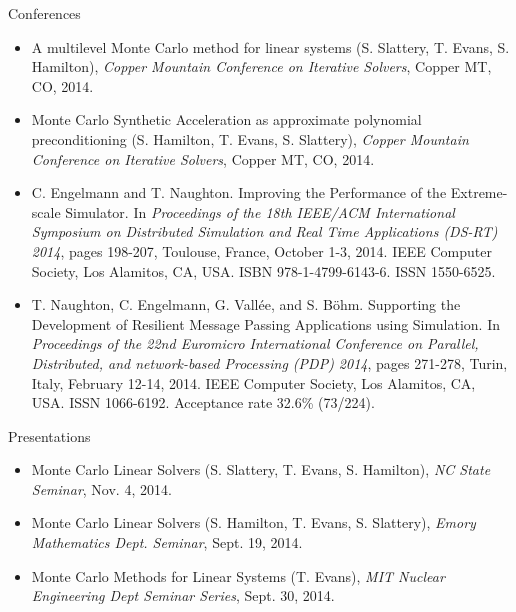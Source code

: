 \documentclass{beamer}
\begin{document}
\begin{frame}{Conferences}

  \begin{itemize}
    \footnotesize
    \setlength{\itemsep}{-0.1\baselineskip}
  \item A multilevel Monte Carlo method for linear systems (S. Slattery,
    T. Evans, S. Hamilton), \textit{Copper Mountain Conference on Iterative
      Solvers}, Copper MT, CO, 2014.
  \item Monte Carlo Synthetic Acceleration as approximate polynomial
    preconditioning (S. Hamilton, T. Evans, S. Slattery), \textit{Copper
      Mountain Conference on Iterative Solvers}, Copper MT, CO, 2014.
  \item C. Engelmann and T. Naughton. Improving the Performance of the
    Extreme-scale Simulator. In \textit{Proceedings of the 18th IEEE/ACM
      International Symposium on Distributed Simulation and Real Time
      Applications (DS-RT) 2014}, pages 198-207, Toulouse, France, October
    1-3, 2014. IEEE Computer Society, Los Alamitos, CA, USA. ISBN
    978-1-4799-6143-6. ISSN 1550-6525.
  \item T. Naughton, C. Engelmann, G. Vallée, and S. Böhm. Supporting the
    Development of Resilient Message Passing Applications using Simulation. In
    \textit{Proceedings of the 22nd Euromicro International Conference on
      Parallel, Distributed, and network-based Processing (PDP) 2014}, pages
    271-278, Turin, Italy, February 12-14, 2014. IEEE Computer Society, Los
    Alamitos, CA, USA. ISSN 1066-6192. Acceptance rate 32.6\% (73/224).
  \end{itemize}

\end{frame}


\begin{frame}{Presentations}

  \begin{itemize}
  \item Monte Carlo Linear Solvers (S. Slattery, T. Evans, S. Hamilton),
    \textit{NC State Seminar}, Nov. 4, 2014.
  \item Monte Carlo Linear Solvers (S. Hamilton, T. Evans, S. Slattery),
    \textit{Emory Mathematics Dept. Seminar}, Sept. 19, 2014.
  \item Monte Carlo Methods for Linear Systems (T. Evans), \textit{MIT Nuclear
      Engineering Dept Seminar Series}, Sept. 30, 2014.
  \end{itemize}

\end{frame}
\end{document}
